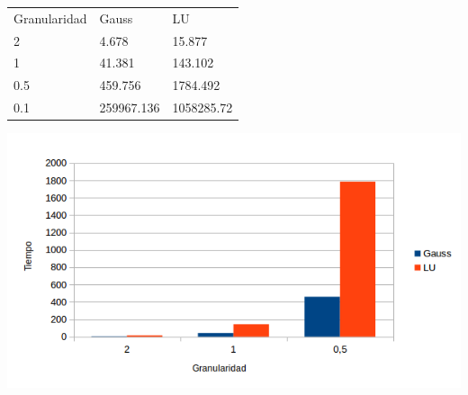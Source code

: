 \begin{table}[h]
\begin{tabular}{lll}
Granularidad & Gauss & LU \\
2 & 4.678 & 15.877 \\
1 & 41.381 & 143.102 \\
0.5 & 459.756 & 1784.492 \\
0.1 & 259967.136 & 1058285.72 \\
\end{tabular}
\end{table}



\begin{center}
 \includegraphics[width=400pt]{imagenes/grafico.png}
\end{center}


